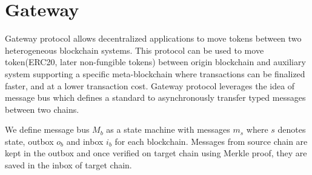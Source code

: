 \documentclass[12pt,a4paper]{article}
\begin{document}
%
%
%
%
%

\newpage

%
%
\section{Gateway}\label{gateway}

Gateway protocol allows decentralized applications to move tokens between two heterogeneous blockchain systems. 
This protocol can be used to move token(ERC20, later non-fungible tokens) between origin blockchain and auxiliary system supporting a specific meta-blockchain where transactions can be finalized faster, and at a lower transaction cost. 
Gateway protocol leverages the idea of message bus which defines a standard to asynchronously transfer typed messages between two chains.
 
We define message bus $M_b$ as a state machine with messages $m_s$ where $s$ denotes state, outbox $o_b$ and inbox $i_b$ for each blockchain. Messages from source chain are kept in the outbox
 and once verified on target chain using Merkle proof, they are saved in the inbox of target chain. 
 
\end{document}
